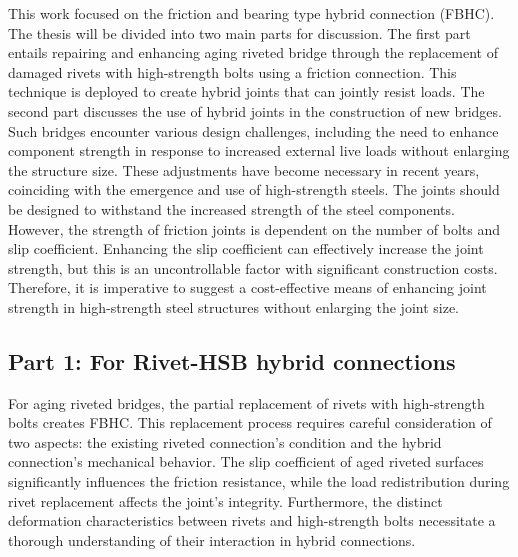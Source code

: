 This work focused on the friction and bearing type hybrid connection (\ac{FBHC}). The thesis will be divided into two main parts for discussion. The first part entails repairing and enhancing aging riveted bridge through the replacement of damaged rivets with high-strength bolts using a friction connection. This technique is deployed to create hybrid joints that can jointly resist loads. The second part discusses the use of hybrid joints in the construction of new bridges. Such bridges encounter various design challenges, including the need to enhance component strength in response to increased external live loads without enlarging the structure size. These adjustments have become necessary in recent years, coinciding with the emergence and use of high-strength steels. The joints should be designed to withstand the increased strength of the steel components. However, the strength of friction joints is dependent on the number of bolts and slip coefficient. Enhancing the slip coefficient can effectively increase the joint strength, but this is an uncontrollable factor with significant construction costs. Therefore, it is imperative to suggest a cost-effective means of enhancing joint strength in high-strength steel structures without enlarging the joint size.


\subsection{Part 1: For Rivet-HSB hybrid connections}

For aging riveted bridges, the partial replacement of rivets with high-strength bolts creates \ac{FBHC}. This replacement process requires careful consideration of two aspects: the existing riveted connection's condition and the hybrid connection's mechanical behavior. The slip coefficient of aged riveted surfaces significantly influences the friction resistance, while the load redistribution during rivet replacement affects the joint's integrity. Furthermore, the distinct deformation characteristics between rivets and high-strength bolts necessitate a thorough understanding of their interaction in hybrid connections.




